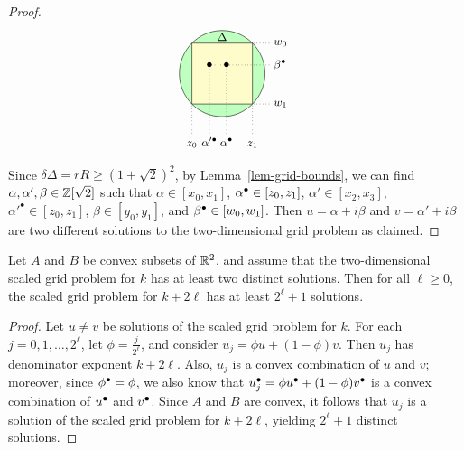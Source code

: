 \documentclass{article}
\begin{document}
\begin{proof}
\[\begin{tikzpicture}[scale=1.5]
    \begin{scope}[shift={(2.5,0)}, scale=0.8]
    \draw[fill=green!25] (0,0) circle (1);
    \draw[fill=yellow!20, line join=round] (-.707,-.707) -- (.707,-.707) -- (.707,.707) -- (-.707,.707) -- cycle;
    \draw (0,.707) +(0,-0.05) node[above] {\small $\Delta$};
    \draw[dotted] (-.707,-1.6875) node[above, anchor=base] {\small $z_0$} +(0, 0.3) -- (-.707,-.707);
    \draw[dotted] (.707,-1.6875) node[above, anchor=base] {\small $z_1$} +(0, 0.3) -- (.707,-.707);
    \draw[dotted] (1.1,.707) node[right] {\small $w_0$} -- (.707,.707);
    \draw[dotted] (1.1,-.707) node[right] {\small $w_1$} -- (.707,-.707);
    \def\dot#1{\draw (#1) node {$\bullet$};}
    \dot{0.1, 0.2}
    \draw[dotted] (0.1, -1.6875) node[above, anchor=base] {\small $\alpha\bul$} +(0, 0.3) -- (0.1, 0.2);
    \dot{-0.3, 0.2} 
    \draw[dotted] (-0.3, -1.6875) node[above, anchor=base] {\small $\alpha'^{\bullet}$} +(0, 0.3) -- (-0.3, 0.2);
    \draw[dotted] (1.1, 0.2) node[right] {\small $\beta\bul$} -- (-0.3, 0.2);
    \end{scope}
  \end{tikzpicture}
  \]
  Since $\delta\Delta=rR\geq (1+\sqrt2)^2$, by
  Lemma~\ref{lem-grid-bounds}, we can find
  $\alpha,\alpha',\beta\in\mathbb{Z}[\sqrt2]$ such that
  $\alpha\in[x_0,x_1]$, $\alpha^{\bullet}\in[z_0,z_1]$,
  $\alpha'\in[x_2,x_3]$, $\alpha'^{\bullet}\in[z_0,z_1]$,
  $\beta\in[y_0,y_1]$, and $\beta^{\bullet}\in[w_0,w_1]$.
  Then $u=\alpha+i\beta$ and $v=\alpha'+i\beta$ are two different
  solutions to the two-dimensional grid problem as claimed.
\end{proof}

\begin{lemma}\label{lem-exponential-grid}
  Let $A$ and $B$ be convex subsets of ${\mathbb{R}}^2$, and assume that the
  two-dimensional scaled grid problem for $k$ has at least two
  distinct solutions. Then for all $\ell\geq 0$, the scaled grid
  problem for $k+2\ell$ has at least $2^\ell+1$ solutions.
\end{lemma}

\begin{proof}
  Let $u\neq v$ be solutions of the scaled grid problem 
  for $k$. For each $j=0,1,\ldots,2^\ell$, let $\phi=\frac{j}{2^\ell}$, 
  and consider $u_j = \phi u + (1-\phi) v$. Then $u_j$ has denominator
  exponent $k+2\ell$. Also, $u_j$ is a convex combination of $u$ and
  $v$; moreover, since $\phi^{\bullet}=\phi$, we also know that $u_j^{\bullet} =
  \phi u^{\bullet} + (1-\phi)v^{\bullet}$ is a convex combination of $u^{\bullet}$ and
  $v^{\bullet}$. Since $A$ and $B$ are convex, it follows that $u_j$ is a
  solution of the scaled grid problem for $k+2\ell$, yielding
  $2^\ell+1$ distinct solutions.
\end{proof}
\end{document}

